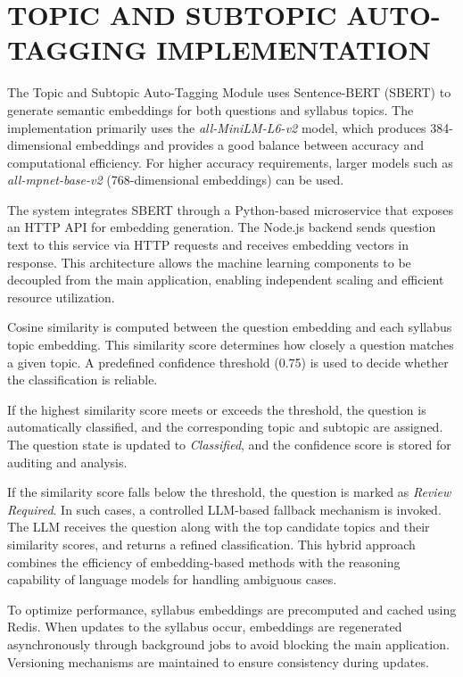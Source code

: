 \begin{sloppypar}
\section{\MakeUppercase{TOPIC AND SUBTOPIC AUTO-TAGGING IMPLEMENTATION}}

The Topic and Subtopic Auto-Tagging Module uses Sentence-BERT (SBERT) to generate semantic embeddings for both questions and syllabus topics. The implementation primarily uses the \textit{all-MiniLM-L6-v2} model, which produces 384-dimensional embeddings and provides a good balance between accuracy and computational efficiency. For higher accuracy requirements, larger models such as \textit{all-mpnet-base-v2} (768-dimensional embeddings) can be used.

The system integrates SBERT through a Python-based microservice that exposes an HTTP API for embedding generation. The Node.js backend sends question text to this service via HTTP requests and receives embedding vectors in response. This architecture allows the machine learning components to be decoupled from the main application, enabling independent scaling and efficient resource utilization.

Cosine similarity is computed between the question embedding and each syllabus topic embedding. This similarity score determines how closely a question matches a given topic. A predefined confidence threshold (0.75) is used to decide whether the classification is reliable.

If the highest similarity score meets or exceeds the threshold, the question is automatically classified, and the corresponding topic and subtopic are assigned. The question state is updated to \textit{Classified}, and the confidence score is stored for auditing and analysis.

If the similarity score falls below the threshold, the question is marked as \textit{Review Required}. In such cases, a controlled LLM-based fallback mechanism is invoked. The LLM receives the question along with the top candidate topics and their similarity scores, and returns a refined classification. This hybrid approach combines the efficiency of embedding-based methods with the reasoning capability of language models for handling ambiguous cases.

To optimize performance, syllabus embeddings are precomputed and cached using Redis. When updates to the syllabus occur, embeddings are regenerated asynchronously through background jobs to avoid blocking the main application. Versioning mechanisms are maintained to ensure consistency during updates.


\end{sloppypar}
